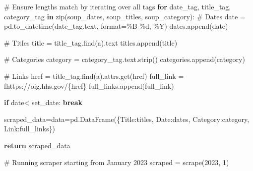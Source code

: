 \documentclass[
  letterpaper,
  DIV=11,
  numbers=noendperiod]{scrartcl}
\newenvironment{Shaded}{\begin{snugshade}}{\end{snugshade}}
\newcommand{\BuiltInTok}[1]{\textcolor[rgb]{0.00,0.23,0.31}{#1}}
\newcommand{\CommentTok}[1]{\textcolor[rgb]{0.37,0.37,0.37}{#1}}
\newcommand{\ControlFlowTok}[1]{\textcolor[rgb]{0.00,0.23,0.31}{\textbf{#1}}}
\newcommand{\DecValTok}[1]{\textcolor[rgb]{0.68,0.00,0.00}{#1}}
\newcommand{\KeywordTok}[1]{\textcolor[rgb]{0.00,0.23,0.31}{\textbf{#1}}}
\newcommand{\NormalTok}[1]{\textcolor[rgb]{0.00,0.23,0.31}{#1}}
\newcommand{\OperatorTok}[1]{\textcolor[rgb]{0.37,0.37,0.37}{#1}}
\newcommand{\SpecialCharTok}[1]{\textcolor[rgb]{0.37,0.37,0.37}{#1}}
\newcommand{\SpecialStringTok}[1]{\textcolor[rgb]{0.13,0.47,0.30}{#1}}
\newcommand{\StringTok}[1]{\textcolor[rgb]{0.13,0.47,0.30}{#1}}
\begin{document}
\begin{Shaded}
\begin{Highlighting}[]
        \CommentTok{\# Ensure lengths match by iterating over all tags}
        \ControlFlowTok{for}\NormalTok{ date\_tag, title\_tag, category\_tag }\KeywordTok{in} \BuiltInTok{zip}\NormalTok{(soup\_dates, soup\_titles, soup\_category):}
            \CommentTok{\# Dates}
\NormalTok{            date }\OperatorTok{=}\NormalTok{ pd.to\_datetime(date\_tag.text, }\BuiltInTok{format}\OperatorTok{=}\StringTok{\textquotesingle{}\%B }\SpecialCharTok{\%d}\StringTok{, \%Y\textquotesingle{}}\NormalTok{)}
\NormalTok{            dates.append(date)}

            \CommentTok{\# Titles}
\NormalTok{            title }\OperatorTok{=}\NormalTok{ title\_tag.find(}\StringTok{\textquotesingle{}a\textquotesingle{}}\NormalTok{).text}
\NormalTok{            titles.append(title)}

            \CommentTok{\# Categories}
\NormalTok{            category }\OperatorTok{=}\NormalTok{ category\_tag.text.strip()}
\NormalTok{            categories.append(category)}

            \CommentTok{\# Links}
\NormalTok{            href }\OperatorTok{=}\NormalTok{ title\_tag.find(}\StringTok{\textquotesingle{}a\textquotesingle{}}\NormalTok{).attrs.get(}\StringTok{\textquotesingle{}href\textquotesingle{}}\NormalTok{)}
\NormalTok{            full\_link }\OperatorTok{=} \SpecialStringTok{f\textquotesingle{}https://oig.hhs.gov/}\SpecialCharTok{\{}\NormalTok{href}\SpecialCharTok{\}}\SpecialStringTok{\textquotesingle{}}
\NormalTok{            full\_links.append(full\_link)}

        \ControlFlowTok{if}\NormalTok{ date}\OperatorTok{\textless{}}\NormalTok{ set\_date:}
            \ControlFlowTok{break}
    
\NormalTok{    scraped\_data}\OperatorTok{=}\NormalTok{data}\OperatorTok{=}\NormalTok{pd.DataFrame(\{}\StringTok{\textquotesingle{}Title\textquotesingle{}}\NormalTok{:titles, }\StringTok{\textquotesingle{}Date\textquotesingle{}}\NormalTok{:dates, }\StringTok{\textquotesingle{}Category\textquotesingle{}}\NormalTok{:category, }\StringTok{\textquotesingle{}Link\textquotesingle{}}\NormalTok{:full\_links\})}
    
    \ControlFlowTok{return}\NormalTok{ scraped\_data}
\end{Highlighting}
\end{Shaded}

\begin{Shaded}
\begin{Highlighting}[]
\CommentTok{\# Running scraper starting from January 2023}
\NormalTok{scraped }\OperatorTok{=}\NormalTok{ scrape(}\DecValTok{2023}\NormalTok{, }\DecValTok{1}\NormalTok{)}
\end{Highlighting}
\end{Shaded}
\end{document}
